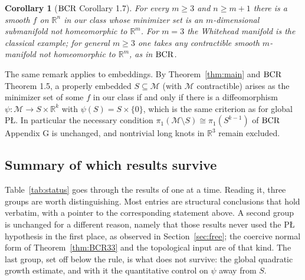 \documentclass[11pt]{article}
\theoremstyle{plain}
\newtheorem{cor}[thm]{Corollary}
\theoremstyle{definition}
\theoremstyle{remark}
\newcommand{\M}{\mathcal{M}}
\newcommand{\R}{\mathbb{R}}
\newcommand{\bcr}{\textup{BCR}}
\begin{document}
\begin{cor}[$\bcr$ Corollary 1.7]
For every $m\ge3$ and $n\ge m+1$ there is a smooth $f$ on $\R^n$ in our class
whose minimizer set is an $m$-dimensional submanifold not homeomorphic to
$\R^m$. For $m=3$ the Whitehead manifold is the classical example; for general
$m\ge3$ one takes any contractible smooth $m$-manifold not homeomorphic to
$\R^m$, as in $\bcr$.
\end{cor}

The same remark applies to embeddings. By Theorem~\ref{thm:main} and $\bcr$
Theorem 1.5, a properly embedded $S\subseteq\M$ (with $\M$ contractible) arises
as the minimizer set of some $f$ in our class if and only if there is a
diffeomorphism $\psi\colon\M\to S\times\R^k$ with
$\psi(S)=S\times\{0\}$, which is the
same criterion as for global P\L{}. In particular the necessary condition
$\pi_1(\M\setminus S)\cong\pi_1(S^{k-1})$ of $\bcr$ Appendix G is unchanged, and
nontrivial long knots in $\R^3$ remain excluded.

\subsection{Summary of which results survive}

Table~\ref{tab:status} goes through the results of \cite{BCR2026} one at a time.
Reading it, three groups are worth distinguishing. Most entries are structural
conclusions that hold verbatim, with a pointer to the corresponding statement
above. A second group is unchanged for a different reason, namely that those
results never used the P\L{} hypothesis in the first place, as observed in
Section~\ref{sec:free}; the coercive normal form of Theorem~\ref{thm:BCR33} and
the topological input are of that kind. The last group, set off below the rule, is
what does not survive: the global quadratic growth estimate, and with it the
quantitative control on $\psi$ away from $S$.
\end{document}
